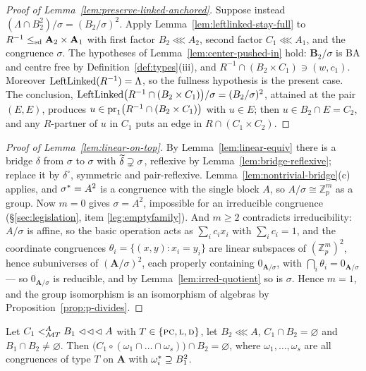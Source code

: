 \begin{proof}[Proof of Lemma~\ref{lem:preserve-linked-anchored}]
Suppose instead $(\Lambda\cap B_{2}^{2})/\sigma=(B_{2}/\sigma)^{2}$. Apply
Lemma~\ref{lem:leftlinked-stay-full} to
$R^{-1}\sdle\mathbf A_{2}\times\mathbf A_{1}$ with first factor
$B_{2}\lll A_{2}$, second factor $C_{1}\lll A_{1}$, and the congruence
$\sigma$. The hypotheses of Lemma~\ref{lem:center-pushed-in} hold:
$\mathbf B_{2}/\sigma$ is BA and centre free by
Definition~\ref{def:types}(iii), and
$R^{-1}\cap(B_{2}\times C_{1})\ni(w,c_{1})$. Moreover
$\LeftLinked(R^{-1})=\Lambda$, so the fullness hypothesis is the present
case. The conclusion,
$\LeftLinked\bigl(R^{-1}\cap(B_{2}\times C_{1})\bigr)/\sigma
=(B_{2}/\sigma)^{2}$, attained at the pair $(E,E)$, produces
$u\in\proj_{1}\bigl(R^{-1}\cap(B_{2}\times C_{1})\bigr)$ with $u\in E$;
then $u\in B_{2}\cap E=C_{2}$, and any $R$-partner of $u$ in $C_{1}$ puts
an edge in $R\cap(C_{1}\times C_{2})$.
\end{proof}

\begin{proof}[Proof of Lemma~\ref{lem:linear-on-top}]
By Lemma~\ref{lem:linear-equiv} there is a bridge $\delta$ from $\sigma$ to
$\sigma$ with $\bcol\delta\supsetneq\sigma$, reflexive by
Lemma~\ref{lem:bridge-reflexive}; replace it by $\delta^{\circ}$, symmetric and
pair-reflexive.
Lemma~\ref{lem:nontrivial-bridge}(c) applies, and $\cover\sigma=A^{2}$ is a
congruence with the single block $A$, so $A/\sigma\cong\mathbb Z_{p}^{m}$ as a
group. Now $m=0$ gives $\sigma=A^{2}$, impossible for an irreducible congruence
(\S\ref{sec:legislation}, item \ref{leg:emptyfamily}). And $m\ge2$ contradicts
irreducibility: $A/\sigma$ is affine, so the basic operation acts as
$\sum_{i}c_{i}x_{i}$ with $\sum_{i}c_{i}=1$, and the coordinate congruences
$\theta_{i}=\{(x,y):x_{i}=y_{i}\}$ are linear subspaces of
$(\mathbb Z_{p}^{m})^{2}$, hence subuniverses of $(\mathbf A/\sigma)^{2}$, each
properly containing $0_{\mathbf A/\sigma}$, with
$\bigcap_{i}\theta_{i}=0_{\mathbf A/\sigma}$ --- so
$0_{\mathbf A/\sigma}$ is reducible, and by Lemma~\ref{lem:irred-quotient} so is
$\sigma$. Hence $m=1$, and the group isomorphism is an isomorphism of algebras
by Proposition~\ref{prop:p-divides}.
\end{proof}

\begin{lemma}\label{lem:multiply-all-linear}
Let $C_{1}\subt[A]{\MT T}B_{1}\lll A$ with $T\in\{\TPC,\TL,\TD\}$, let
$B_{2}\lll A$, $C_{1}\cap B_{2}=\varnothing$ and $B_{1}\cap B_{2}\neq
\varnothing$. Then $\bigl(C_{1}\circ(\omega_{1}\cap\dots\cap\omega_{s})\bigr)
\cap B_{2}=\varnothing$, where $\omega_{1},\dots,\omega_{s}$ are all congruences
of type $T$ on $\mathbf A$ with $\cover{\omega_{i}}\supseteq B_{1}^{2}$.
\end{lemma}

